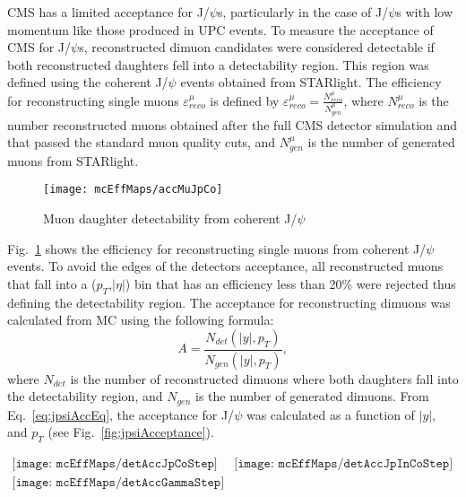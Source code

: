        CMS has a limited acceptance for J/$\psi$s, particularly in the case of 
        J/$\psi$s with low momentum like those produced in UPC events. 
      To measure the acceptance of CMS for J/$\psi$s, reconstructed dimuon 
        candidates were considered detectable if both reconstructed daughters 
        fell into a detectability region.
      This region was defined using the coherent J/$\psi$ events obtained from 
        STARlight.
      The efficiency for reconstructing single muons $\varepsilon^{\mu}_{reco}$ 
        is defined by $\varepsilon^{\mu}_{reco} = \frac{N^{\mu}_{reco}}{N^{\mu}_{gen}}$, 
        where $N^{\mu}_{reco}$ is the number reconstructed muons obtained 
        after the full CMS detector simulation and that passed the standard
        muon quality cuts, and $N^{\mu}_{gen}$ is the number of generated 
        muons from STARlight.
      \begin{figure}[!Hhtb]
        \centering
          \texttt{[image: mcEffMaps/accMuJpCo]} 
        \caption{ Muon daughter detectability from coherent J/$\psi$}
        \label{fig:muonDaughterDet}
      \end{figure}
      Fig.~\ref{fig:muonDaughterDet} shows the efficiency for reconstructing
        single muons from coherent J/$\psi$ events.
      To avoid the edges of the detectors acceptance, all reconstructed muons 
        that fall into a ($p_{T}$,$|\eta|$) bin that has an efficiency less 
        than 20\% were rejected thus defining the detectability region.
      The acceptance for reconstructing dimuons was calculated from MC
        using the following formula:
      \begin{equation}
        A=\frac{N_{det}(|y|,p_{T})}{N_{gen}(|y|,p_{T})},
        \label{eq:jpsiAccEq}
      \end{equation}
        where $N_{det}$ is the number of reconstructed dimuons where both 
        daughters fall into the detectability region, and $N_{gen}$ is the
        number of generated dimuons. 
      From Eq.~\ref{eq:jpsiAccEq}, the acceptance for J/$\psi$ was calculated
        as a function of $|y|$, and $p_{T}$ (see Fig.~\ref{fig:jpsiAcceptance}).
        \begin{figure*}[!Hhtb]
          \centering
          $ \begin{array}{cc}
            \texttt{[image: mcEffMaps/detAccJpCoStep]} &
            \texttt{[image: mcEffMaps/detAccJpInCoStep]} \\
            \texttt{[image: mcEffMaps/detAccGammaStep]}
          \end{array} $
          \caption{Dimuon acceptance from coherent J/$\psi$ (top left), incoherent 
            J$\psi$ (top right), and photon-photon interactions (lower).}
          \label{fig:jpsiAcceptance}
        \end{figure*}

